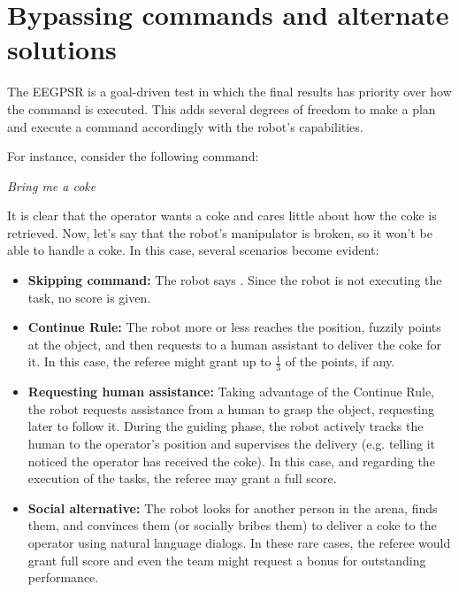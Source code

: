 \section{Bypassing commands and alternate solutions}
The EEGPSR is a goal-driven test in which the final results has priority over how the command is executed.
This adds several degrees of freedom to make a plan and execute a command accordingly with the robot's capabilities.

For instance, consider the following command:

\begin{center}
\noindent\textit{Bring me a coke}
\end{center}

It is clear that the operator wants a coke and cares little about how the coke is retrieved. Now, let's say that the robot's manipulator is broken, so it won't be able to handle a coke. In this case, several scenarios become evident:

\begin{itemize}
	\item \textbf{Skipping command:} The robot says . Since the robot is not executing the task, no score is given.

	\item \textbf{Continue Rule:} The robot more or less reaches the position, fuzzily points at the object, and then requests to a human assistant to deliver the coke for it. In this case, the referee might grant up to $\frac{1}{3}$ of the points, if any.

	\item \textbf{Requesting human assistance:} Taking advantage of the Continue Rule, the robot requests assistance from a human to grasp the object, requesting later to follow it. During the guiding phase, the robot actively tracks the human to the operator's position and supervises the delivery (e.g. telling it noticed the operator has received the coke). In this case, and regarding the execution of the tasks, the referee may grant a full score.

	\item \textbf{Social alternative:} The robot looks for another person in the arena, finds them, and convinces them (or socially bribes them) to deliver a coke to the operator using natural language dialogs. In these rare cases, the referee would grant full score and even the team might request a bonus for outstanding performance.
\end{itemize}

